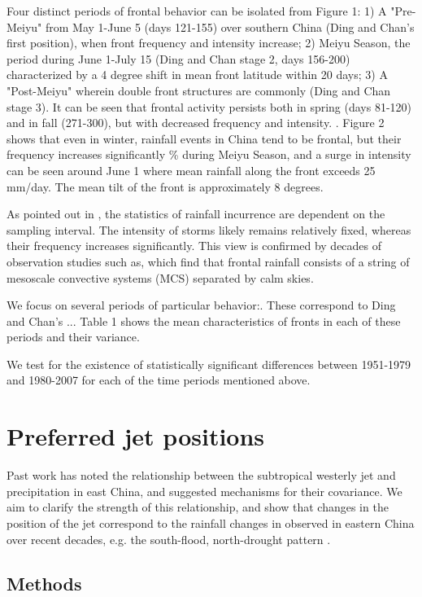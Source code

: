 \documentclass[draft,grl]{AGUTeX}
\begin{document}
\begin{article}
	Four distinct periods of frontal behavior can be isolated from Figure 1: 1) A "Pre-Meiyu" from May 1-June 5 (days 121-155) over southern China (Ding and Chan's first position), when front frequency and intensity increase; 2) Meiyu Season, the period during June 1-July 15 (Ding and Chan stage 2, days 156-200) characterized by a 4 degree shift in mean front latitude within 20 days; 3) A "Post-Meiyu" wherein double front structures are commonly (Ding and Chan stage 3). It can be seen that frontal activity persists both in spring (days 81-120) and in fall (271-300), but with decreased frequency and intensity. . Figure 2 shows that even in winter, rainfall events in China tend to be frontal, but their frequency increases significantly \% during Meiyu Season, and a surge in intensity can be seen around June 1 where mean rainfall along the front exceeds 25 mm/day. The mean tilt of the front is approximately 8 degrees.
	
	As pointed out in \citet{Biasutti2011}, the statistics of rainfall incurrence are dependent on the sampling interval. The intensity of storms likely remains relatively fixed, whereas their frequency increases significantly. This view is confirmed by decades of observation studies such as\citet{Murakami1984}, which find that frontal rainfall consists of a string of mesoscale convective systems (MCS) separated by calm skies.
	
	We focus on several periods of particular behavior:. These correspond to Ding and Chan's ... Table 1 shows the mean characteristics of fronts in each of these periods and their variance.
	
	
	We test for the existence of statistically significant differences between 1951-1979 and 1980-2007 for each of the time periods mentioned above.
	
\section{Preferred jet positions}
Past work has noted the relationship between the subtropical westerly jet and precipitation in east China, and suggested mechanisms for their covariance\citep{Molnar2010, Sampe2010, Chen2014}. We aim to clarify the strength of this relationship, and show that changes in the position of the jet correspond to the rainfall changes in observed in eastern China over recent decades, e.g. the south-flood, north-drought pattern \citep{Nigam2013}. 

\subsection{Methods} 


\end{article}
\end{document}
